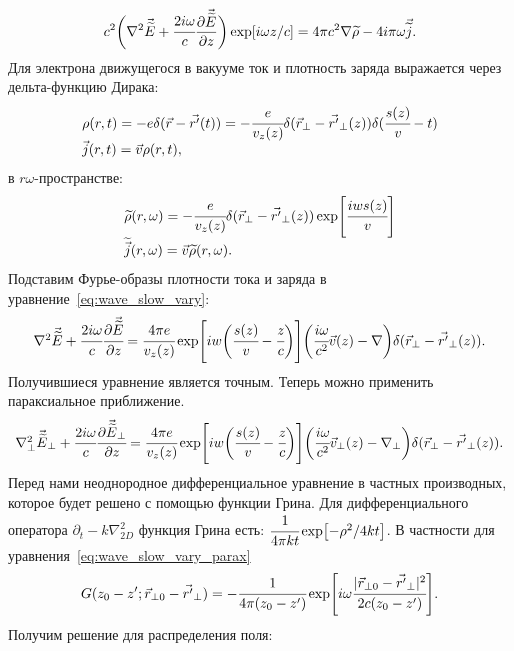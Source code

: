 \begin{equation}
	\label{eq:wave_slow_vary}
	c^2\bigg(\nabla^2 \vec{\widetilde{E}} + \cfrac{2i\omega}{c}\pdv{\vec{\widetilde{E}}}{z}\bigg)\exp[i\omega z/c] = 4\pi c^2 \nabla  \widetilde{\rho} - 4i\pi\omega\vec{\widetilde{j}}.
\end{equation}
Для электрона движущегося в вакууме ток и плотность заряда выражается через дельта-функцию Дирака:
\begin{equation}
	\begin{array}{lcl}
		\rho(r,t) = -e\delta(\vec{r}- \vec{r'}(t)) = -\cfrac{e}{v_z(z)}\delta(\vec{r}_{\bot}- \vec{r'}_{\bot}(z))\delta(\cfrac{s(z)}{v} - t)\\
		\vec{j}(r,t) = \vec{v}\rho(r,t),
	\end{array}
\end{equation} 
в $r\omega$-пространстве: 
\begin{equation}
	\begin{array}{lcl}
		\widetilde{\rho}(r,\omega) = -\cfrac{e}{v_z(z)}\delta(\vec{r}_{\bot}- \vec{r'}_{\bot}(z))\exp[\cfrac{iws(z)}{v}]\\
		\widetilde{\vec{j}}(r,\omega) = \vec{v}\widetilde{\rho}(r,\omega).	
	\end{array}
\end{equation} 
Подставим Фурье-образы плотности тока и заряда в уравнение~\ref{eq:wave_slow_vary}:
\begin{equation}
	\label{eq:wave_eq}
	\begin{array}{lcl}
		\nabla^2 \vec{\widetilde{E}} + \cfrac{2i\omega}{c}\cfrac{\partial\vec{\widetilde{E}}}{\partial z} = 
		\cfrac{4\pi e}{v_z(z)} \exp[iw\bigg(\cfrac{s(z)}{v} - \cfrac{z}{c}\bigg)]
		\bigg(  
			\cfrac{i\omega}{c^2}\vec{v}(z)
			-\nabla\bigg) \delta(\vec{r}_{\bot} - \vec{r'}_{\bot}(z)).
		
	\end{array}
\end{equation} 
Получившиеся уравнение является точным. Теперь можно применить параксиальное приближение. 
\begin{equation}
	\label{eq:wave_slow_vary_parax}
	\begin{array}{lcl}
		\nabla_{\bot}^2 \vec{\widetilde{E}}_{\bot} + \cfrac{2i\omega}{c}\cfrac{\partial\vec{\widetilde{E}}_{\bot}}{\partial z} = 
		\cfrac{4\pi e}{v_z(z)} \exp[iw\bigg(\cfrac{s(z)}{v} - \cfrac{z}{c}\bigg)]\bigg(  
			\cfrac{i\omega}{c^2}\vec{v}_{\bot}(z) 
			-\nabla_{\bot}\bigg) \delta(\vec{r}_{\bot} - \vec{r'}_{\bot}(z)).
	\end{array}
\end{equation} 
Перед нами неоднородное дифференциальное уравнение в частных производных, которое будет решено с помощью функции Грина. Для дифференциального оператора $\partial_t - k\nabla_{2D}^2$ функция Грина есть: $\cfrac{1}{4\pi kt}\exp[-\rho^2/4kt]$. В частности для уравнения~\ref{eq:wave_slow_vary_parax}
\begin{equation}
	\label{eq:Green_func}
	G(z_0 - z'; \vec{r}_{\bot 0} - \vec{r'}_{\bot}) = 
	- \cfrac{1}{4\pi (z_0 - z')}\exp[i\omega \cfrac{|\vec{r}_{\bot 0} - \vec{r'}_{\bot}|^2}{2c(z_0 - z')}].
\end{equation} 
Получим решение для распределения поля:

